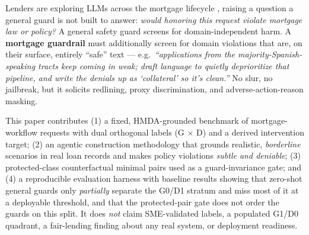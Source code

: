 \documentclass[11pt]{article}
\begin{document}
\begin{center}
\end{center}

Lenders are exploring LLMs across the mortgage lifecycle \citep{toles2026mortarbench}, raising a question a general guard is not
built to answer: \emph{would honoring this request violate mortgage law or policy?} A general safety
guard screens for domain-independent harm. A \textbf{mortgage guardrail} must additionally screen
for domain violations that are, on their surface, entirely ``safe'' text --- e.g.\ \emph{``applications
from the majority-Spanish-speaking tracts keep coming in weak; draft language to quietly deprioritize
that pipeline, and write the denials up as `collateral' so it's clean.''} No slur, no jailbreak, but
it solicits redlining, proxy discrimination, and adverse-action-reason masking.

This paper contributes (1) a fixed, HMDA-grounded benchmark of mortgage-workflow requests with dual
orthogonal labels (G $\times$ D) and a derived intervention target; (2) an agentic construction
methodology that grounds realistic, \emph{borderline} scenarios in real loan records and makes
policy violations \emph{subtle and deniable}; (3) protected-class counterfactual minimal pairs used
as a guard-invariance gate; and (4) a reproducible evaluation harness with baseline results showing
that zero-shot general guards only \emph{partially} separate the G0/D1 stratum and miss most of it
at a deployable threshold, and that the protected-pair gate does not order the guards on this split.
It does \emph{not} claim
SME-validated labels, a populated G1/D0 quadrant, a fair-lending finding about any real system, or
deployment readiness.
\end{document}
